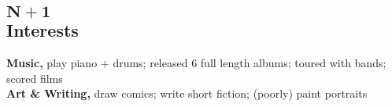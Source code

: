 \documentclass[margin]{res}
\begin{document}
\begin{resume}
\section{$\mathbf{N+1}$ \\ Interests}
{\bf Music,} play piano $+$ drums; released 6 full length albums; toured with bands; scored films \\
{\bf Art \& Writing,} draw comics; write short fiction; (poorly) paint portraits \\

\end{resume}
\end{document}
